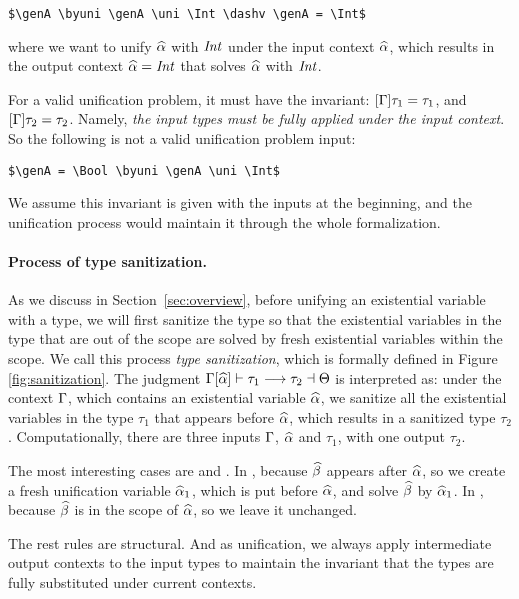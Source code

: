 \begin{lstlisting}
$\genA \byuni \genA \uni \Int \dashv \genA = \Int$
\end{lstlisting}

\noindent where we want to unify $\widehat{\alpha}$ with $\mathit{Int}$ under the input context
$\widehat{\alpha}$, which results in the output context $\widehat{\alpha} = \mathit{Int}$ that solves $\widehat{\alpha}$
with $\mathit{Int}$.

For a valid unification problem, it must have the invariant: $[\Gamma] \tau_1 =
\tau_1$, and $[\Gamma] \tau_2 = \tau_2$. Namely,
\textit{the input types must be
fully applied under the input context}.
 So the following is not a valid
unification problem input:

\begin{lstlisting}
$\genA = \Bool \byuni \genA \uni \Int$
\end{lstlisting}

We assume this invariant is given with the inputs at the beginning,
and the unification process would maintain it through the whole
formalization.

\paragraph{Process of type sanitization.}

As we discuss in Section~\ref{sec:overview}, before unifying an existential
variable with a type, we will first sanitize the type so that the existential
variables in the type that are out of the scope are solved by fresh existential
variables within the scope. We call this process \textit{type sanitization},
which is formally defined in Figure \ref{fig:sanitization}. The judgment
$\Gamma[\widehat{\alpha}] \vdash \tau_1 \longrightarrow \tau_2 \dashv \Theta$ is interpreted as: under the
context $\Gamma$, which contains an existential variable $\widehat{\alpha}$, we sanitize all
the existential variables in the type $\tau_1$ that appears before $\widehat{\alpha}$,
which results in a sanitized type $\tau_2$. Computationally, there are three
inputs $\Gamma$, $\widehat{\alpha}$ and $\tau_1$, with one output $\tau_2$.

The most interesting cases are  and . In
, because $\widehat{\beta}$ appears after $\widehat{\alpha}$, so we create a fresh
unification variable $\widehat{\alpha}_1$, which is put before $\widehat{\alpha}$, and solve $\widehat{\beta}$
by $\widehat{\alpha}_1$. In , because $\widehat{\beta}$ is in the scope of $\widehat{\alpha}$,
so we leave it unchanged.

The rest rules are structural.
And as unification, we always apply intermediate output
contexts to the input types to maintain the invariant that the types are fully
substituted under current contexts.

